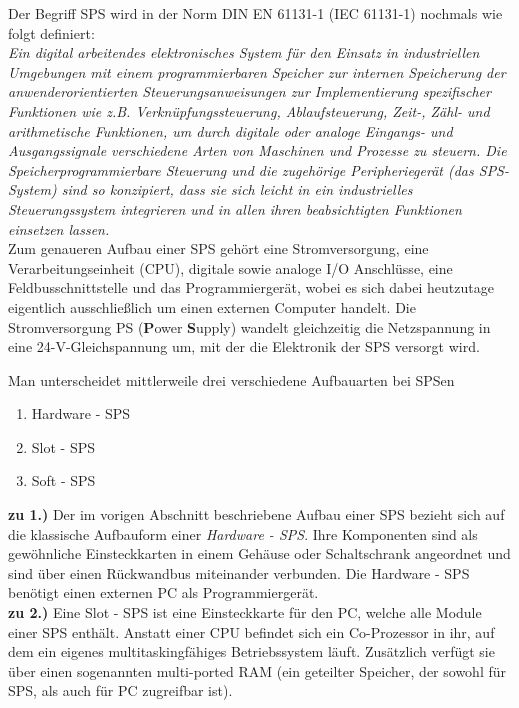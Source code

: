 	Der Begriff SPS wird in der Norm DIN EN 61131-1 (IEC 61131-1) nochmals wie folgt definiert:\\
	
	\glqq \textit{Ein digital arbeitendes elektronisches System für den Einsatz in industriellen Umgebungen mit einem programmierbaren Speicher zur internen Speicherung der anwenderorientierten Steuerungsanweisungen zur Implementierung spezifischer Funktionen wie z.B. Verknüpfungssteuerung, Ablaufsteuerung, Zeit-, Zähl- und arithmetische Funktionen, um durch digitale oder analoge Eingangs- und Ausgangssignale verschiedene Arten von Maschinen und Prozesse zu steuern. Die Speicherprogrammierbare Steuerung und die zugehörige Peripheriegerät (das SPS- System) sind so konzipiert, dass sie sich leicht in ein industrielles Steuerungssystem integrieren und in allen ihren beabsichtigten Funktionen einsetzen lassen.}\grqq \space [6] \\
	
	Zum genaueren Aufbau einer SPS gehört eine Stromversorgung, eine Verarbeitungseinheit (CPU), digitale sowie analoge I/O Anschlüsse, eine Feldbusschnittstelle und das Programmiergerät, wobei es sich dabei heutzutage eigentlich ausschließlich um einen externen Computer handelt. Die Stromversorgung PS (\textbf{P}ower \textbf{S}upply) wandelt gleichzeitig die Netzspannung in eine 24-V-Gleichspannung um, mit der die Elektronik der SPS versorgt wird.
	
	Man unterscheidet mittlerweile drei verschiedene Aufbauarten bei SPSen
	
	\begin{enumerate}
  		\item Hardware - SPS
  		\item Slot - SPS
  		\item Soft - SPS
	\end{enumerate}

	\textbf{zu 1.)} Der im vorigen Abschnitt beschriebene Aufbau einer SPS bezieht sich auf die klassische Aufbauform einer \textit{Hardware - SPS}. Ihre Komponenten sind als gewöhnliche Einsteckkarten in einem Gehäuse oder Schaltschrank angeordnet und sind über einen Rückwandbus miteinander verbunden. Die Hardware - SPS benötigt einen externen PC als Programmiergerät.\\
	
	\textbf{zu 2.)} Eine Slot - SPS ist eine Einsteckkarte für den PC, welche alle Module einer SPS enthält. Anstatt einer CPU befindet sich ein Co-Prozessor in ihr, auf dem ein eigenes multitaskingfähiges Betriebssystem läuft. Zusätzlich verfügt sie über einen sogenannten multi-ported RAM (ein geteilter Speicher, der sowohl für SPS, als auch für PC zugreifbar ist).\\
	
